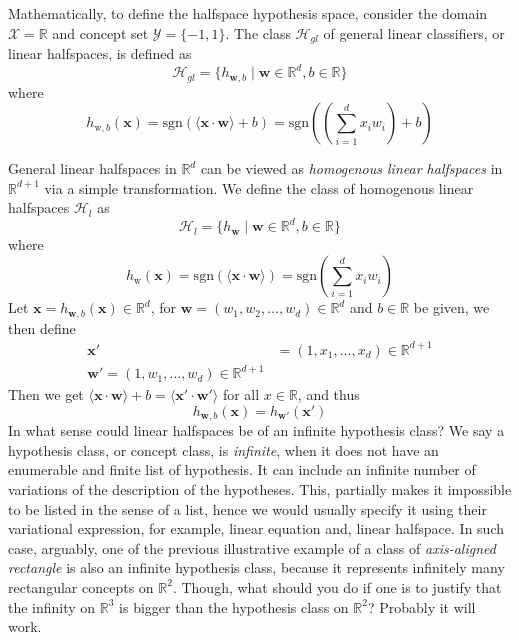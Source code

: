 Mathematically, to define the halfspace hypothesis space, consider the domain $\mathcal{X}=\mathbb{R}$ and concept set $\mathcal{Y}=\{-1,1\}$. The class $\mathcal{H}_{gl}$ of general linear classifiers, or linear halfspaces, is defined as 
\begin{equation}
    \mathcal{H}_{gl} = \{ h_{\bm{w},b} \mid \bm{w}\in \mathbb{R}^{d}, b\in \mathbb{R}\}
\end{equation}
where 
\begin{equation}
    h_{\mbox{w},b}(\bm{x}) = \mathrm{sgn}(\langle \bm{x}\cdot \bm{w}\rangle + b) = \mathrm{sgn}\left(\left( \sum^{d}_{i=1} x_{i} w_{i}  \right) +b\right)
\end{equation}

General linear halfspaces in $\mathbb{R}^{d}$ can be viewed as \textit{homogenous linear halfspaces} in $\mathbb{R}^{d+1}$ via a simple transformation. We define the class of homogenous linear halfspaces $\mathcal{H}_{l}$ as 
\begin{equation*}
    \mathcal{H}_{l} = \{ h_{\bm{w}} \mid \bm{w}\in \mathbb{R}^{d}, b\in \mathbb{R}\}
\end{equation*}
where 
\begin{equation}
    h_{\mbox{w}}(\bm{x}) = \mathrm{sgn}(\langle \bm{x}\cdot \bm{w}\rangle) = \mathrm{sgn}\left( \sum^{d}_{i=1} x_{i} w_{i} \right)
\end{equation}
Let $\bm{x}=h_{\bm{w},b}(\bm{x})\in \mathbb{R}^{d}$, for $\bm{w}=(w_1, w_2,\dots,w_{d})\in \mathbb{R}^{d}$ and $b\in \mathbb{R}$ be given, we then define 
\begin{align}
    \bm{x}' &= (1,x_1,\dots,x_{d}) \in \mathbb{R}^{d+1}\\
    \bm{w}' = (1,w_1,\dots,w_d) \in \mathbb{R}^{d+1}
\end{align}
Then we get $\langle \bm{x}\cdot \bm{w}\rangle + b = \langle \bm{x}'\cdot \bm{w}'\rangle$ for all $x\in \mathbb{R}$, and thus 
\begin{equation*}
    h_{\bm{w},b}(\bm{x}) = h_{\bm{w}'}(\bm{x}')
\end{equation*}
In what sense could linear halfspaces be of an infinite hypothesis class? We say a hypothesis class, or concept class, is \textit{infinite}, when it does not have an enumerable and finite list of hypothesis. It can include an infinite number of variations of the description of the hypotheses. This, partially makes it impossible to be listed in the sense of a list, hence we would usually specify it using their variational expression, for example, linear equation and, linear halfspace. In such case, arguably, one of the previous illustrative example of a class of \textit{axis-aligned rectangle} is also an infinite hypothesis class, because it represents infinitely many rectangular concepts on $\mathbb{R}^{2}$. Though, what should you do if one is to justify that the infinity on $\mathbb{R}^{3}$ is bigger than the hypothesis class on $\mathbb{R}^{2}$? Probably it will work. 

